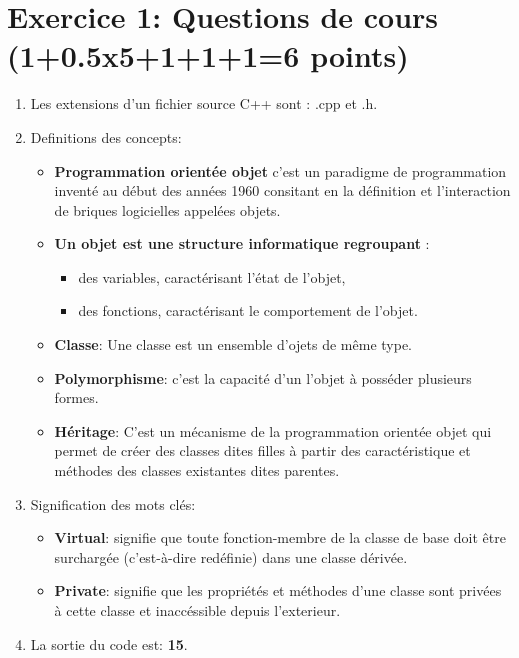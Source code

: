 \section*{Exercice 1: \scriptsize{Questions de cours (1+0.5x5+1+1+1=6 points)}}
\begin{enumerate}
    \item Les extensions d'un fichier source C++ sont : .cpp et .h.
    \item Definitions des concepts:
          \begin{itemize}
              \item \textbf{Programmation orientée objet} c'est un paradigme de programmation inventé au
                    début des années 1960 consitant en la définition et l'interaction de briques logicielles appelées objets.
              \item \textbf{Un objet est une structure informatique regroupant} :
                    \begin{itemize}
                        \item des variables, caractérisant l’état de l’objet,
                        \item des fonctions, caractérisant le comportement de l’objet.
                    \end{itemize}
              \item \textbf{Classe}:  Une classe est un ensemble d'ojets de même type.
              \item \textbf{Polymorphisme}: c'est la capacité d'un l'objet à
                    posséder plusieurs formes.
              \item \textbf{Héritage}: C'est un mécanisme de la programmation orientée objet qui permet de créer des classes dites filles à partir des caractéristique et méthodes des classes existantes dites parentes.
          \end{itemize}
    \item Signification des mots clés:
          \begin{itemize}
              \item \textbf{Virtual}: signifie que toute fonction-membre de la classe de base doit être surchargée (c'est-à-dire redéfinie) dans une classe
                    dérivée.
              \item \textbf{Private}: signifie que les propriétés et méthodes d'une classe sont privées à cette classe et inaccéssible depuis l'exterieur.
          \end{itemize}
    \item La sortie du code est: \textbf{15}.
\end{enumerate}